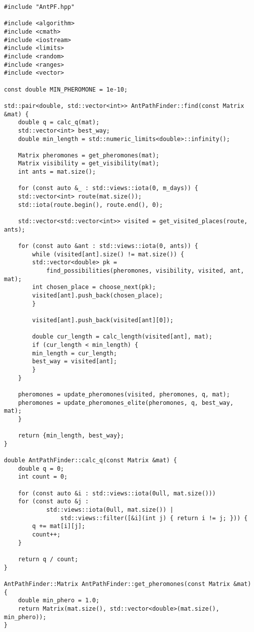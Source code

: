 \begin{lstlisting}[caption={Реализация муравьиного алгоритма},label=lst:ant]
#include "AntPF.hpp"

#include <algorithm>
#include <cmath>
#include <iostream>
#include <limits>
#include <random>
#include <ranges>
#include <vector>

const double MIN_PHEROMONE = 1e-10;

std::pair<double, std::vector<int>> AntPathFinder::find(const Matrix &mat) {
    double q = calc_q(mat);
    std::vector<int> best_way;
    double min_length = std::numeric_limits<double>::infinity();

    Matrix pheromones = get_pheromones(mat);
    Matrix visibility = get_visibility(mat);
    int ants = mat.size();

    for (const auto &_ : std::views::iota(0, m_days)) {
    std::vector<int> route(mat.size());
    std::iota(route.begin(), route.end(), 0);

    std::vector<std::vector<int>> visited = get_visited_places(route, ants);

    for (const auto &ant : std::views::iota(0, ants)) {
        while (visited[ant].size() != mat.size()) {
        std::vector<double> pk =
            find_possibilities(pheromones, visibility, visited, ant, mat);
        int chosen_place = choose_next(pk);
        visited[ant].push_back(chosen_place);
        }

        visited[ant].push_back(visited[ant][0]);

        double cur_length = calc_length(visited[ant], mat);
        if (cur_length < min_length) {
        min_length = cur_length;
        best_way = visited[ant];
        }
    }

    pheromones = update_pheromones(visited, pheromones, q, mat);
    pheromones = update_pheromones_elite(pheromones, q, best_way, mat);
    }

    return {min_length, best_way};
}

double AntPathFinder::calc_q(const Matrix &mat) {
    double q = 0;
    int count = 0;

    for (const auto &i : std::views::iota(0ull, mat.size()))
    for (const auto &j :
            std::views::iota(0ull, mat.size()) |
                std::views::filter([&i](int j) { return i != j; })) {
        q += mat[i][j];
        count++;
    }

    return q / count;
}

AntPathFinder::Matrix AntPathFinder::get_pheromones(const Matrix &mat) {
    double min_phero = 1.0;
    return Matrix(mat.size(), std::vector<double>(mat.size(), min_phero));
}


\end{lstlisting}

